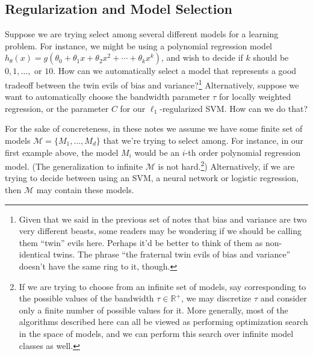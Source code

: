 \titlespacing*{\part}{0pt}{-20pt}{30pt} %
\titlespacing*{\chapter}{0pt}{-10pt}{30pt}

\begin{fullwidth}
\part{Regularization and Model Selection}
\label{part:regularization}
\end{fullwidth}


Suppose we are trying select among several different models for a learning
problem. For instance, we might be using a polynomial regression model
$h_\theta (x) = g(\theta_0 + \theta_1 x + \theta_2 x^2 + \cdots + \theta_k x^k)$, and wish to decide if $k$ should be
$0, 1, \ldots,$ or $10$. How can we automatically select a model that represents a
good tradeoff between the twin evils of bias and variance?\footnote{
Given that we said in the previous set of notes that bias and variance are two very
different beasts, some readers may be wondering if we should be calling them ``twin'' evils
here. Perhaps it'd be better to think of them as non-identical twins. The phrase ``the
fraternal twin evils of bias and variance'' doesn't have the same ring to it, though.} Alternatively,
suppose we want to automatically choose the bandwidth parameter $\tau$ for
locally weighted regression, or the parameter $C$ for our $\ell_1$-regularized SVM.
How can we do that?

For the sake of concreteness, in these notes we assume we have some
finite set of models $\mathcal M = \{M_1 ,\ldots ,M_d\}$ that we're trying to select among.
For instance, in our first example above, the model $M_i$ would be an $i$-th
order polynomial regression model. (The generalization to infinite $\mathcal M$ is not
hard.\footnote{
If we are trying to choose from an infinite set of models, say corresponding to the
possible values of the bandwidth $\tau \in \mathbb R^+$, we may discretize $\tau$ and consider only a finite
number of possible values for it. More generally, most of the algorithms described here
can all be viewed as performing optimization search in the space of models, and we can
perform this search over infinite model classes as well.}) Alternatively, if we are trying to decide between using an SVM, a
neural network or logistic regression, then $\mathcal M$ may contain these models.


